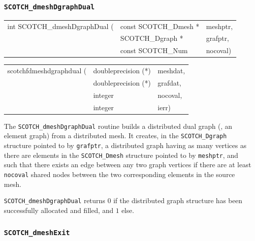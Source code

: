 \subsubsection{\texttt{SCOTCH\_dmeshDgraphDual}}
\label{sec-lib-func-dmeshdgraphdual}

\begin{itemize}
\progsyn

{\tt\begin{tabular}{l@{}ll}
int SCOTCH\_dmeshDgraphDual ( & const SCOTCH\_Dmesh * & meshptr, \\
                              & SCOTCH\_Dgraph *      & grafptr, \\
                              & const SCOTCH\_Num     & nocoval)
\end{tabular}}

{\tt\begin{tabular}{l@{}ll}
scotchfdmeshdgraphdual ( & doubleprecision (*) & meshdat, \\
                         & doubleprecision (*) & grafdat, \\
                         & integer             & nocoval, \\
                         & integer             & ierr)
\end{tabular}}

\progdes

The \texttt{SCOTCH\_dmeshDgraphDual} routine builds a distributed dual
graph (\ie, an element graph) from a distributed mesh. It creates, in
the \texttt{SCOTCH\_\lbt Dgraph} structure pointed to by
\texttt{grafptr}, a distributed graph having as many vertices as there
are elements in the \texttt{SCOTCH\_\lbt Dmesh} structure pointed to
by \texttt{meshptr}, and such that there exists an edge between any
two graph vertices if there are at least \texttt{nocoval} shared nodes
between the two corresponding elements in the source mesh.

\progret

\texttt{SCOTCH\_dmeshDgraphDual} returns $0$ if the distributed graph
structure has been successfully allocated and filled, and $1$ else.
\end{itemize}

\subsubsection{{\tt SCOTCH\_dmeshExit}}

